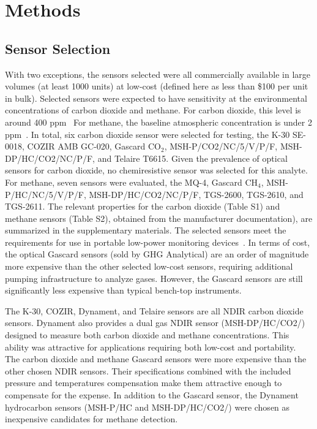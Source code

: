 \documentclass[times]{joehreview}
\begin{document}
	\section{Methods}
	\label{sec:methods}
	
	\subsection{Sensor Selection}
	
	With two exceptions, the sensors selected were all commercially available in large volumes (at least 1000 units) at low-cost (defined here as less than \$100 per unit in bulk). Selected sensors were expected to have sensitivity at the environmental concentrations of carbon dioxide and methane. For carbon dioxide, this level is around 400 ppm~\cite{blasing_recent_2016,dlugokencky_trends_2016}  For methane, the baseline atmospheric concentration is under 2 ppm~\cite{turner_large_2016,bamberger_spatial_2014,dlugokencky_trends_2016-1}.  In total, six carbon dioxide sensor were selected for testing, the K-30 SE-0018, COZIR AMB GC-020, Gascard CO$_{2}$, MSH-P/CO2/NC/5/V/P/F, MSH-DP/HC/CO2/NC/P/F, and Telaire T6615.  Given the prevalence of optical sensors for carbon dioxide, no chemiresistive sensor was selected for this analyte.  For methane, seven sensors were evaluated, the MQ-4, Gascard CH$_{4}$, MSH-P/HC/NC/5/V/P/F, MSH-DP/HC/CO2/NC/P/F, TGS-2600, TGS-2610, and TGS-2611.  The relevant properties for the carbon dioxide (Table S1) and methane sensors (Table S2), obtained from the manufacturer documentation), are summarized in the supplementary materials.  The selected sensors meet the requirements for use in portable low-power monitoring devices~\cite{karpov_energy_2013}.  In terms of cost, the optical Gascard sensors (sold by GHG Analytical) are an order of magnitude more expensive than the other selected low-cost sensors, requiring additional pumping infrastructure to analyze gases.  However, the Gascard sensors are still significantly less expensive than typical bench-top instruments.
	
	The K-30, COZIR, Dynament, and Telaire sensors are all NDIR carbon dioxide sensors.  Dynament also provides a dual gas NDIR sensor (MSH-DP/HC/CO2/) designed to measure both carbon dioxide and methane concentrations. This ability was attractive for applications requiring both low-cost and portability.  The carbon dioxide and methane Gascard sensors were more expensive than the other chosen NDIR sensors.  Their specifications combined with the included pressure and temperatures compensation make them attractive enough to compensate for the expense. In addition to the Gascard sensor, the Dynament hydrocarbon sensors (MSH-P/HC and MSH-DP/HC/CO2/) were chosen as inexpensive candidates for methane detection.
	
\end{document}

